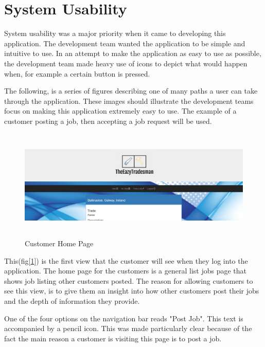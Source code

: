 \section{System Usability}
\label{sec:SystemEvaluationUsability}

System usability was a major priority when it came to developing this application. The development team wanted the application to be simple and intuitive to use. In an attempt to make the application as easy to use as possible, the development team made heavy use of icons to depict what would happen when, for example a certain button is pressed. 

\bigskip

The following, is a series of figures describing one of many paths a user can take through the application. These images should illustrate the development teams focus on making this application extremely easy to use. The example of a customer posting a job, then accepting a job request will be used.

\begin{figure}[H]
    \centering
    \includegraphics[width=\textwidth, height=150pt]{img/Customer1.PNG}
    \caption{Customer Home Page}
    \label{fig:cutomerHome}
\end{figure}

\bigskip

This(fig[\ref{fig:cutomerHome}]) is the first view that the customer will see when they log into the application. The home page for the customers is a general list jobs page that shows job listing other customers posted. The reason for allowing customers to see this view, is to give them an insight into how other customers post their jobs and the depth of information they provide.

One of the four options on the navigation bar reads "Post Job". This text is accompanied by a pencil icon. This was made particularly clear because of the fact the main reason a customer is visiting this page is to post a job.

